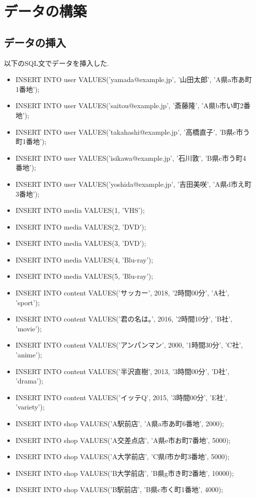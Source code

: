 \documentclass{jarticle}
\begin{document}
\section{データの構築}
\subsection{データの挿入}
以下のSQL文でデータを挿入した.
\begin{itemize}
\item INSERT INTO user VALUES('yamada@example.jp', '山田太郎', 'A県a市あ町1番地');
\item INSERT INTO user VALUES('saitou@example.jp', '斎藤隆', 'A県b市い町2番地');
\item INSERT INTO user VALUES('takahashi@example.jp', '高橋直子', 'B県c市う町1番地');
\item INSERT INTO user VALUES('isikawa@example.jp', '石川敦', 'B県c市う町4番地');
\item INSERT INTO user VALUES('yoshida@example.jp', '吉田美咲', 'A県d市え町3番地');
\item INSERT INTO media VALUES(1, 'VHS');
\item INSERT INTO media VALUES(2, 'DVD');
\item INSERT INTO media VALUES(3, 'DVD');
\item INSERT INTO media VALUES(4, 'Blu-ray');
\item INSERT INTO media VALUES(5, 'Blu-ray');
\item INSERT INTO content VALUES('サッカー', 2018, '2時間00分', 'A社', 'sport');
\item INSERT INTO content VALUES('君の名は。', 2016, '2時間10分', 'B社', 'movie');
\item INSERT INTO content VALUES('アンパンマン', 2000, '1時間30分', 'C社', 'anime');
\item INSERT INTO content VALUES('半沢直樹', 2013, '3時間00分', 'D社', 'drama');
\item INSERT INTO content VALUES('イッテQ', 2015, '3時間00分', 'E社', 'variety');
\item INSERT INTO shop VALUES('A駅前店', 'A県a市あ町6番地', 2000);
\item INSERT INTO shop VALUES('A交差点店', 'A県e市お町7番地', 5000);
\item INSERT INTO shop VALUES('A大学前店', 'C県f市か町3番地', 5000);
\item INSERT INTO shop VALUES('B大学前店', 'B県g市き町2番地', 10000);
\item INSERT INTO shop VALUES('B駅前店', 'B県c市く町1番地', 4000);

\end{itemize}
\end{document}

